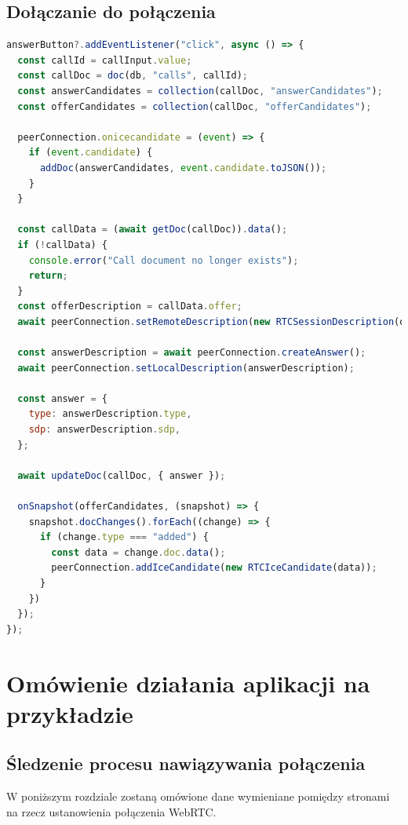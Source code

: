 \subsection{Dołączanie do połączenia}

\begin{lstlisting}[language=Javascript,label=list:call-join, caption=Dołączanie do połączenia połączenia,
basicstyle=\footnotesize \ttfamily, showtabs=true, tabsize=4]
answerButton?.addEventListener("click", async () => {
  const callId = callInput.value;
  const callDoc = doc(db, "calls", callId);
  const answerCandidates = collection(callDoc, "answerCandidates");
  const offerCandidates = collection(callDoc, "offerCandidates");

  peerConnection.onicecandidate = (event) => {
    if (event.candidate) {
      addDoc(answerCandidates, event.candidate.toJSON());
    }
  }

  const callData = (await getDoc(callDoc)).data();
  if (!callData) {
    console.error("Call document no longer exists");
    return;
  }
  const offerDescription = callData.offer;
  await peerConnection.setRemoteDescription(new RTCSessionDescription(offerDescription));

  const answerDescription = await peerConnection.createAnswer();
  await peerConnection.setLocalDescription(answerDescription);

  const answer = {
    type: answerDescription.type,
    sdp: answerDescription.sdp,
  };

  await updateDoc(callDoc, { answer });

  onSnapshot(offerCandidates, (snapshot) => {
    snapshot.docChanges().forEach((change) => {
      if (change.type === "added") {
        const data = change.doc.data();
        peerConnection.addIceCandidate(new RTCIceCandidate(data));
      }
    })
  });
});
\end{lstlisting}

\section{Omówienie działania aplikacji na przykładzie}
\subsection{Śledzenie procesu nawiązywania połączenia}

W poniższym rozdziale zostaną omówione dane wymieniane pomiędzy stronami na rzecz ustanowienia połączenia WebRTC.



